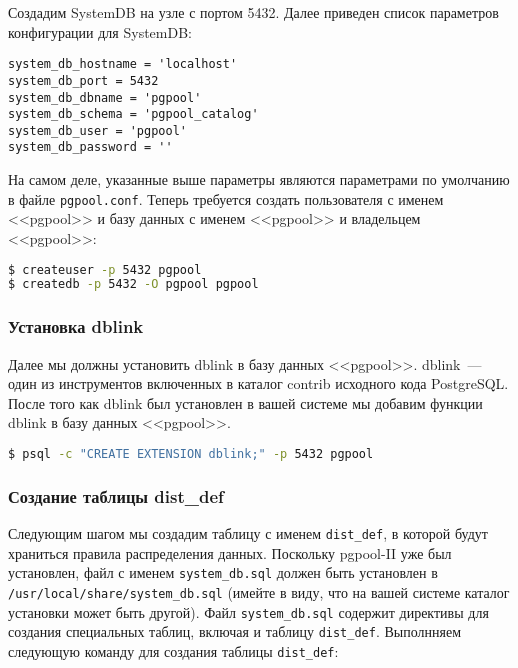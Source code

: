 Создадим SystemDB на узле с портом 5432. Далее приведен список параметров конфигурации для SystemDB:

\begin{lstlisting}[label=lst:pgpool26,caption=Настройка SystemDB]
system_db_hostname = 'localhost'
system_db_port = 5432
system_db_dbname = 'pgpool'
system_db_schema = 'pgpool_catalog'
system_db_user = 'pgpool'
system_db_password = ''
\end{lstlisting}

На самом деле, указанные выше параметры являются параметрами по умолчанию в файле \lstinline!pgpool.conf!. Теперь требуется создать пользователя с именем <<pgpool>> и базу данных с именем <<pgpool>> и владельцем <<pgpool>>:

\begin{lstlisting}[language=Bash,label=lst:pgpool27,caption=Настройка SystemDB]
$ createuser -p 5432 pgpool
$ createdb -p 5432 -O pgpool pgpool
\end{lstlisting}

\subsubsection{Установка dblink}

Далее мы должны установить dblink в базу данных <<pgpool>>. dblink~--- один из инструментов включенных в каталог contrib исходного кода PostgreSQL. После того как dblink был установлен в вашей системе мы добавим функции dblink в базу данных <<pgpool>>.

\begin{lstlisting}[language=Bash,label=lst:pgpool29,caption=Установка dblink]
$ psql -c "CREATE EXTENSION dblink;" -p 5432 pgpool
\end{lstlisting}

\subsubsection{Создание таблицы dist\_def}

Следующим шагом мы создадим таблицу с именем \lstinline!dist_def!, в которой будут храниться правила распределения данных. Поскольку pgpool-II уже был установлен, файл с именем \lstinline!system_db.sql! должен быть установлен в \lstinline!/usr/local/share/system_db.sql! (имейте в виду, что на вашей системе каталог установки может быть другой). Файл \lstinline!system_db.sql! содержит директивы для создания специальных таблиц, включая и таблицу \lstinline!dist_def!. Выполнняем следующую команду для создания таблицы \lstinline!dist_def!:

